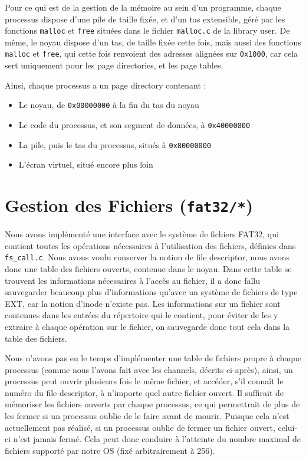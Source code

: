 \documentclass[a4paper,10pt, french]{article}
\newcommand{\code}[1]{\texttt{#1}}
\begin{document}
Pour ce qui est de la gestion de la mémoire au sein d'un programme, chaque processus dispose d'une pile de taille fixée, et d'un tas extensible,
géré par les fonctions \code{malloc} et \code{free} situées dans le fichier \code{malloc.c} de la library user.
De même, le noyau dispose d'un tas, de taille fixée cette fois, mais aussi des fonctions \code{malloc} et \code{free},
qui cette fois renvoient des adresses alignées sur \code{0x1000}, car cela sert uniquement pour les page directories, et les page tables.

Ainsi, chaque processus a un page directory contenant : 
\begin{itemize}
 \item Le noyau, de \code{0x00000000} à la fin du tas du noyau
 \item Le code du processus, et son segment de données, à \code{0x40000000}
 \item La pile, puis le tas du processus, situés à \code{0x80000000}
 \item L'écran virtuel, situé encore plus loin
\end{itemize}

\section{Gestion des Fichiers (\code{fat32/*})}
Nous avons implémenté une interface avec le système de fichiers FAT32, qui contient toutes les opérations
nécessaires à l'utilisation des fichiers, définies dans \code{fs\_call.c}.
Nous avons voulu conserver la notion de file descriptor, nous avons donc une table des fichiers ouverts, contenue 
dans le noyau. Dans cette table se trouvent les informations nécessaires à l'accès au fichier, il a donc fallu sauvegarder beaucoup 
plus d'informations qu'avec un système de fichiers de type EXT, car la notion d'inode n'existe pas.
Les informations sur un fichier sont contenues dans les entrées du répertoire qui le contient, pour éviter de les y
extraire à chaque opération sur le fichier, on sauvegarde donc tout cela dans la table des fichiers.

Nous n'avons pas eu le temps d'implémenter une table de fichiers propre à chaque processus (comme nous l'avons fait avec les
channels, décrits ci-après), ainsi, un processus peut ouvrir plusieurs fois le même fichier, et accéder, s'il connaît le numéro 
du file descriptor, à n'importe quel autre fichier ouvert. Il suffirait de mémoriser les fichiers ouverts par chaque processus,
ce qui permettrait de plus de les fermer si un processus oublie de le faire avant de mourir. Puisque cela
n'est actuellement pas réalisé, si un processus oublie de fermer un fichier ouvert, celui-ci n'est jamais fermé.
Cela peut donc conduire à l'atteinte du nombre maximal de fichiers supporté par notre OS (fixé arbitrairement à 256).
\end{document}
